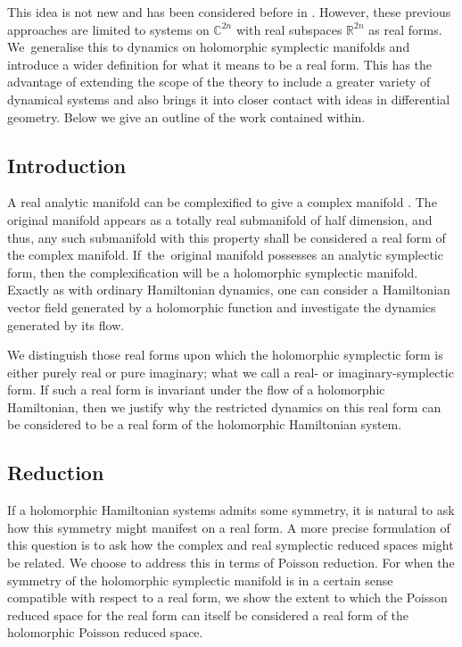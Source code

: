 \documentclass[pdftex]{sigma}
\numberwithin{equation}{section}
\newcommand{\R}{\mathbb{R}}
\newcommand{\C}{\mathbb{C}}
\begin{document}
This idea is not new and has been considered before in \cite{bulgarian3,bulgarian4,bulgarian1,bulgarian2}. However, these previous approaches are limited to systems on $\C^{2n}$ with real subspaces $\R^{2n}$ as real forms. We~generalise this to dynamics on holomorphic symplectic manifolds and introduce a wider definition for what it means to be a real form. This has the advantage of extending the scope of the theory to include a greater variety of dynamical systems and also brings it into closer contact with ideas in differential geometry. Below we give an outline of the work contained within.

\subsection{Introduction}

A real analytic manifold can be complexified to give a complex manifold \cite{kulkarni,realform2,realform1}. The original manifold appears as a totally real submanifold of half dimension, and thus, any such submanifold with this property shall be considered a real form of the complex manifold. If~the~original manifold possesses an analytic symplectic form, then the complexification will be a holomorphic symplectic manifold. Exactly as with ordinary Hamiltonian dynamics, one can consider a Hamiltonian vector field generated by a holomorphic function and investigate the dynamics generated by its flow.

We distinguish those real forms upon which the holomorphic symplectic form is either purely real or pure imaginary; what we call a real- or imaginary-symplectic form. If such a real form is invariant under the flow of a holomorphic Hamiltonian, then we justify why the restricted dynamics on this real form can be considered to be a real form of the holomorphic Hamiltonian system.

\subsection{Reduction}
If a holomorphic Hamiltonian systems admits some symmetry, it is natural to ask how this symmetry might manifest on a real form. A more precise formulation of this question is to ask how the complex and real symplectic reduced spaces might be related. We choose to address this in terms of Poisson reduction. For when the symmetry of the holomorphic symplectic manifold is in a certain sense compatible with respect to a real form, we show the extent to which the Poisson reduced space for the real form can itself be considered a real form of the holomorphic Poisson reduced space.
\end{document}
